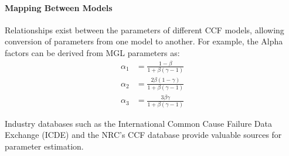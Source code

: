 \paragraph{Mapping Between Models}
Relationships exist between the parameters of different CCF models, allowing conversion of parameters from one model to another. For example, the Alpha factors can be derived from MGL parameters as:
\[
\begin{aligned}
\alpha_1 &= \frac{1-\beta}{1+\beta(\gamma-1)} \\
\alpha_2 &= \frac{2\beta(1-\gamma)}{1+\beta(\gamma-1)} \\
\alpha_3 &= \frac{3\beta\gamma}{1+\beta(\gamma-1)}
\end{aligned}
\]

Industry databases such as the International Common Cause Failure Data Exchange (ICDE) \cite{ICDE} and the NRC's CCF database \cite{ma_ccf_2022} provide valuable sources for parameter estimation.
